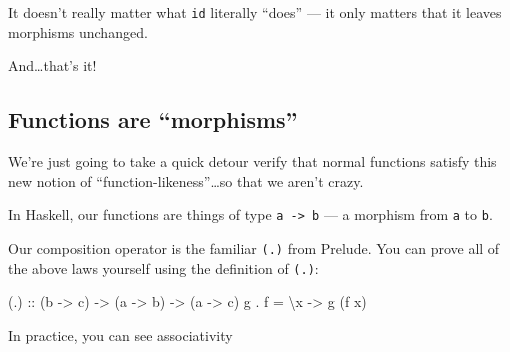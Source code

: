 \documentclass[]{article}
\newenvironment{Shaded}{}{}
\newcommand{\DataTypeTok}[1]{\textcolor[rgb]{0.56,0.13,0.00}{#1}}
\newcommand{\DecValTok}[1]{\textcolor[rgb]{0.25,0.63,0.44}{#1}}
\newcommand{\NormalTok}[1]{#1}
\newcommand{\OperatorTok}[1]{\textcolor[rgb]{0.40,0.40,0.40}{#1}}
\newcommand{\OtherTok}[1]{\textcolor[rgb]{0.00,0.44,0.13}{#1}}
\begin{document}
It doesn't really matter what \texttt{id} literally ``does'' --- it only matters
that it leaves morphisms unchanged.

And\ldots that's it!

\subsection{Functions are ``morphisms''}\label{functions-are-morphisms}

We're just going to take a quick detour verify that normal functions satisfy
this new notion of ``function-likeness''\ldots so that we aren't crazy.

In Haskell, our functions are things of type \texttt{a\ -\textgreater{}\ b} ---
a morphism from \texttt{a} to \texttt{b}.

Our composition operator is the familiar \texttt{(.)} from Prelude. You can
prove all of the above laws yourself using the definition of \texttt{(.)}:

\begin{Shaded}
\begin{Highlighting}[]
\OtherTok{(.) ::}\NormalTok{ (b }\OtherTok{{-}\textgreater{}}\NormalTok{ c) }\OtherTok{{-}\textgreater{}}\NormalTok{ (a }\OtherTok{{-}\textgreater{}}\NormalTok{ b) }\OtherTok{{-}\textgreater{}}\NormalTok{ (a }\OtherTok{{-}\textgreater{}}\NormalTok{ c)}
\NormalTok{g }\OperatorTok{.}\NormalTok{ f }\OtherTok{=}\NormalTok{ \textbackslash{}x }\OtherTok{{-}\textgreater{}}\NormalTok{ g (f x)}
\end{Highlighting}
\end{Shaded}

In practice, you can see associativity

\begin{Shaded}
\end{Shaded}
\end{document}
